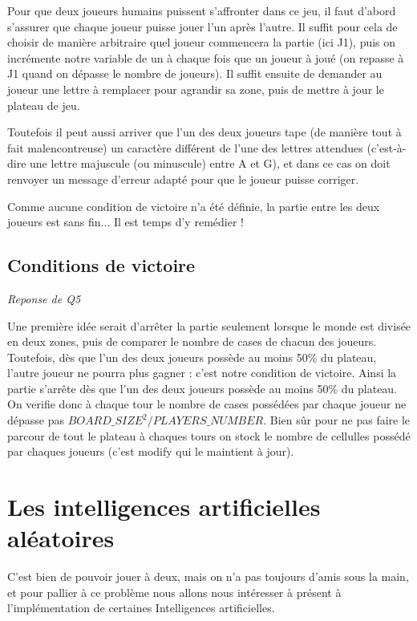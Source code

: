 \documentclass[a4paper,11pt]{article}
\begin{document}
Pour que deux joueurs humains puissent s'affronter dans ce jeu, il faut d'abord s'assurer que chaque joueur puisse jouer l'un après l'autre. Il suffit pour cela  de choisir de manière arbitraire quel joueur commencera la partie (ici J1), puis on incrémente notre variable de un à chaque fois que un joueur à joué (on repasse à J1 quand on dépasse le nombre de joueurs). Il suffit ensuite de demander au joueur une lettre à remplacer pour agrandir sa zone, puis de mettre à jour le plateau de jeu.

Toutefois il peut aussi arriver que l'un des deux joueurs tape (de manière tout à fait malencontreuse) un caractère différent de l'une des lettres attendues  (c'est-à-dire une lettre majuscule (ou minuscule) entre A et G), et dans ce cas on doit renvoyer un message d'erreur adapté pour que le joueur puisse corriger.

Comme aucune condition de victoire n'a été définie, la partie entre les deux joueurs est sans fin... Il est temps d'y remédier !  


\subsection{Conditions de victoire}
\emph{Reponse de Q5}

Une première idée serait d'arrêter la partie seulement lorsque le monde est
divisée en deux zones, puis de comparer le nombre de cases de chacun des joueurs.
Toutefois, dès que l'un des deux joueurs possède au moins 50\% du plateau, l'autre joueur
ne pourra plus gagner : c'est notre condition de victoire. 
Ainsi la partie s'arrête dès que l'un des deux joueurs possède au moins 50\% du plateau.
On verifie donc à chaque tour le nombre de cases possédées par chaque joueur ne dépasse pas $BOARD\_SIZE^2/PLAYERS\_NUMBER$. Bien sûr pour ne pas faire le parcour de tout le plateau à chaques tours on stock le nombre de cellulles possédé par chaques joueurs (c'est modify qui le maintient à jour).


\section{Les intelligences artificielles aléatoires}

C'est bien de pouvoir jouer à deux, mais on n'a pas toujours d'amis sous la
main, et pour pallier à ce problème nous allons nous intéresser à présent 
à l'implémentation de certaines Intelligences artificielles.
\end{document}
